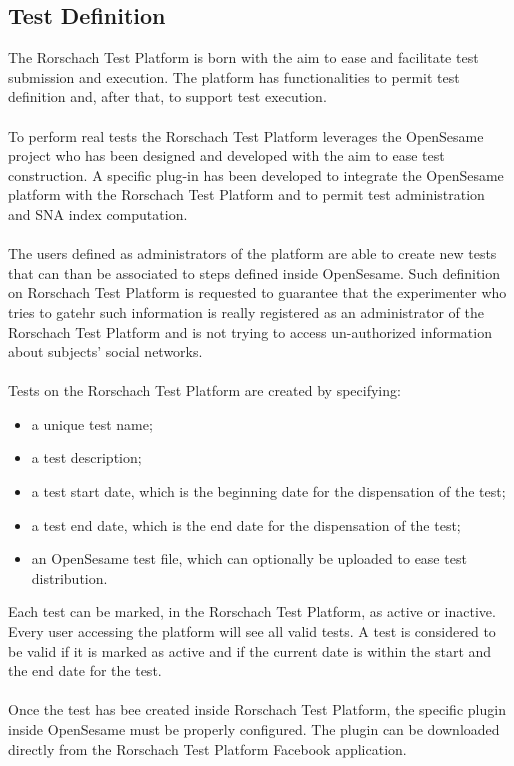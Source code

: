 \subsection{Test Definition}
The Rorschach Test Platform is born with the aim to ease and facilitate test submission and execution.
The platform has functionalities to permit test definition and, after that, to support test execution.\\
\\
To perform real tests the Rorschach Test Platform leverages the OpenSesame project who has been designed and developed with the aim to ease test construction.
A specific plug-in has been developed to integrate the OpenSesame platform with the Rorschach Test Platform and to permit test administration and SNA index computation.\\
\\
The users defined as administrators of the platform are able to create new tests that can than be associated to steps defined inside OpenSesame.
Such definition on Rorschach Test Platform is requested to guarantee that the experimenter who tries to gatehr such information is really registered as an administrator
of the Rorschach Test Platform and is not trying to access un-authorized information about subjects' social networks.\\
\\
Tests on the Rorschach Test Platform are created by specifying:
\begin{itemize}
\item a unique test name;
\item a test description;
\item a test start date, which is the beginning date for the dispensation of the test;
\item a test end date, which is the end date for the dispensation of the test;
\item an OpenSesame test file, which can optionally be uploaded to ease test distribution.
\end{itemize}

Each test can be marked, in the Rorschach Test Platform, as active or inactive.
Every user accessing the platform will see all valid tests.
A test is considered to be valid if it is marked as active and if the current date is within the start and the end date for the test.\\
\\
Once the test has bee created inside Rorschach Test Platform, the specific plugin inside OpenSesame must be properly configured.
The plugin can be downloaded directly from the Rorschach Test Platform Facebook application.\\
\\

